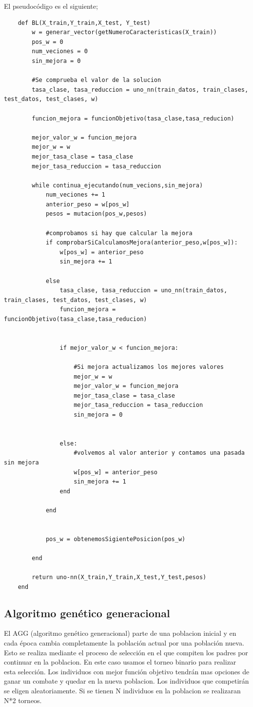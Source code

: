 \documentclass[titlepage]{article}
\begin{document}
	El pseudocódigo es el siguiente;
	\newpage
	\begin{lstlisting}
	def BL(X_train,Y_train,X_test, Y_test)
		w = generar_vector(getNumeroCaracteristicas(X_train))
		pos_w = 0
		num_veciones = 0
		sin_mejora = 0
		
		#Se comprueba el valor de la solucion
		tasa_clase, tasa_reduccion = uno_nn(train_datos, train_clases, test_datos, test_clases, w)
		
		funcion_mejora = funcionObjetivo(tasa_clase,tasa_reducion)
		
		mejor_valor_w = funcion_mejora
		mejor_w = w
		mejor_tasa_clase = tasa_clase
		mejor_tasa_reduccion = tasa_reduccion
		
		while continua_ejecutando(num_vecions,sin_mejora)
			num_veciones += 1
			anterior_peso = w[pos_w]
			pesos = mutacion(pos_w,pesos)
			
			#comprobamos si hay que calcular la mejora
			if comprobarSiCalculamosMejora(anterior_peso,w[pos_w]):
				w[pos_w] = anterior_peso
				sin_mejora += 1	
				
			else
				tasa_clase, tasa_reduccion = uno_nn(train_datos, train_clases, test_datos, test_clases, w)            
				funcion_mejora = funcionObjetivo(tasa_clase,tasa_reducion)
				
				
				if mejor_valor_w < funcion_mejora:
					
					#Si mejora actualizamos los mejores valores
					mejor_w = w
					mejor_valor_w = funcion_mejora
					mejor_tasa_clase = tasa_clase
					mejor_tasa_reduccion = tasa_reduccion
					sin_mejora = 0
				
				
				else:
					#volvemos al valor anterior y contamos una pasada sin mejora
					w[pos_w] = anterior_peso
					sin_mejora += 1
				end
			
			end
			
			
			pos_w = obtenemosSigientePosicion(pos_w)
		
		end
		
		return uno-nn(X_train,Y_train,X_test,Y_test,pesos)
	end
	\end{lstlisting}
	\subsection{Algoritmo genético generacional}
	El AGG (algoritmo genético generacional) parte de una poblacion inicial y en cada época cambia completamente la población actual por una población nueva. Esto se realiza mediante el proceso de selección en el que compiten los padres por continuar en la poblacion. En este caso usamos el torneo binario para realizar esta selección. Los individuos con mejor función objetivo tendrán mas opciones de ganar un combate y quedar en la nueva poblacion. Los individuos que competirán se eligen aleatoriamente. Si se tienen N individuos en la poblacion se realizaran N*2 torneos. 
	
\end{document}
